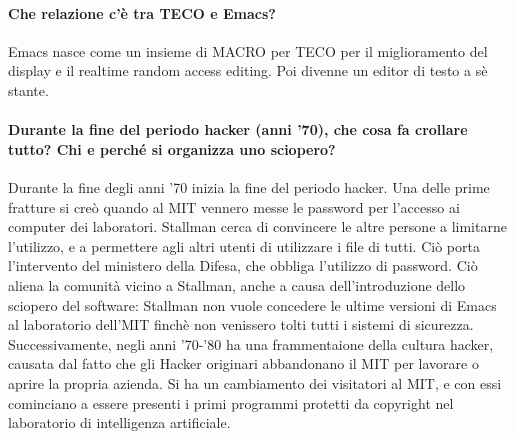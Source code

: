 \documentclass[a4paper]{article}
\begin{document}
		\paragraph{Che relazione c'è tra TECO e Emacs?}
		Emacs nasce come un insieme di MACRO per TECO per il miglioramento del display e il realtime random access editing. Poi divenne un editor di testo a sè stante.
		
		\paragraph{Durante la fine del periodo hacker (anni '70), che cosa fa crollare tutto? Chi e perché si organizza uno sciopero?}
		Durante la fine degli anni '70 inizia la fine del periodo hacker. Una delle prime fratture si creò quando al MIT vennero messe le password per l'accesso ai computer dei laboratori. Stallman cerca di convincere le altre persone a limitarne l’utilizzo, e a permettere agli altri utenti di utilizzare i file di tutti. Ciò porta l’intervento del ministero della Difesa, che obbliga l'utilizzo di password. Ciò aliena la comunità vicino a Stallman, anche a causa dell’introduzione dello sciopero del software: Stallman non vuole concedere le ultime versioni di Emacs al laboratorio dell'MIT finchè non venissero tolti tutti i sistemi di sicurezza. \\
		Successivamente, negli anni '70-'80 ha una frammentaione della cultura hacker, causata dal fatto che gli Hacker originari abbandonano il MIT per lavorare o aprire la propria azienda. Si ha un cambiamento dei visitatori al MIT, e con essi cominciano a essere presenti i primi programmi protetti da copyright nel laboratorio di intelligenza artificiale. \\
\end{document}
